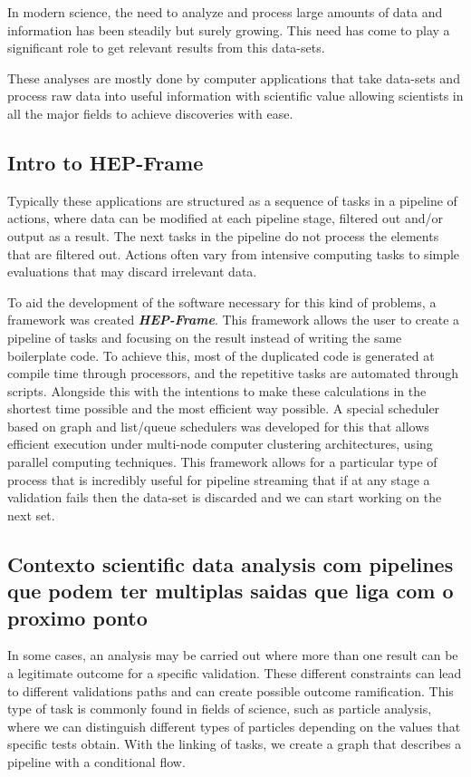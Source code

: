 In modern science, the need to analyze and process large amounts of data and information has been steadily but surely growing. This need has come to play a significant role to get relevant results from this data-sets.
\par These analyses are mostly done by computer applications that take data-sets and process raw data into useful information with scientific value allowing scientists in all the major fields to achieve discoveries with ease.

\subsection{Intro to HEP-Frame}
 Typically these applications are structured as a sequence of tasks in a pipeline of actions, where data can be modified at each pipeline stage, filtered out and/or output as a result. The next tasks in the pipeline do not process the elements that are filtered out. Actions often vary from intensive computing tasks to simple evaluations that may discard irrelevant data.
\par To aid the development of the software necessary for this kind of problems, a framework was created \textit{\textbf{HEP-Frame}}. This framework allows the user to create a pipeline of tasks and focusing on the result instead of writing the same boilerplate code. To achieve this, most of the duplicated code is generated at compile time through processors, and the repetitive tasks are automated through scripts. Alongside this with the intentions to make these calculations in the shortest time possible and the most efficient way possible. A special scheduler based on graph and list/queue schedulers was developed for this that allows efficient execution under multi-node computer clustering architectures, using parallel computing techniques.
This framework allows for a particular type of process that is incredibly useful for pipeline streaming that if at any stage a validation fails then the data-set is discarded and we can start working on the next set.





\subsection{Contexto scientific data analysis com pipelines que podem ter multiplas saidas que liga com o proximo ponto}
In some cases, an analysis may be carried out where more than one result can be a legitimate outcome for a specific validation. These different constraints can lead to different validations paths and can create possible outcome ramification. This type of task is commonly found in fields of science, such as particle analysis, where we can distinguish different types of particles depending on the values that specific tests obtain.
With the linking of tasks, we create a graph that describes a pipeline with a conditional flow.


